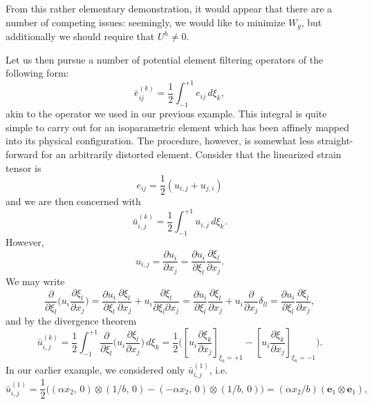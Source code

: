 \documentclass[11pt]{article} %
\begin{document}
From this rather elementary demonstration, it would appear that there are a number of competing issues: seemingly, we would like to minimize $W_g$, but additionally we should require that $U^h \neq 0$.

Let us then pursue a number of potential element filtering operators of the following form:
\begin{equation}
	\bar{e}_{ij}^{(k)} = \frac{1}{2} \int_{-1}^{+1} e_{ij} \, d \xi_k ,
\end{equation}
akin to the operator we used in our previous example. This integral is quite simple to carry out for an isoparametric element which has been affinely mapped into its physical configuration. The procedure, however, is somewhat less straight-forward for an arbitrarily distorted element. Consider that the linearized strain tensor is
\begin{equation}
	e_{ij} = \frac{1}{2} (u_{i,j} + u_{j,i})
\end{equation}
and we are then concerned with
\begin{equation}
	\bar{u}_{i,j}^{(k)} = \frac{1}{2} \int_{-1}^{+1} u_{i,j} \, d \xi_k .
\end{equation}
However,
\begin{equation}
	u_{i,j} = \frac{\partial u_i}{\partial x_j} = \frac{\partial u_i}{\partial \xi_l} \frac{\partial \xi_l}{\partial x_j}.
\end{equation}
We may write
\begin{equation}
	\frac{\partial}{\partial \xi_l} \bigg( u_i \frac{\partial \xi_l}{\partial x_j} \bigg) = \frac{\partial u_i}{\partial \xi_l} \frac{\partial \xi_l}{\partial x_j} + u_i \frac{\partial \xi_l}{\partial \xi_l \partial x_j} = \frac{\partial u_i}{\partial \xi_l} \frac{\partial \xi_l}{\partial x_j} + u_i \frac{\partial}{\partial x_j} \delta_{ll} = \frac{\partial u_i}{\partial \xi_l} \frac{\partial \xi_l}{\partial x_j},
\end{equation}
and by the divergence theorem
\begin{equation}
	\bar{u}_{i,j}^{(k)} = \frac{1}{2} \int_{-1}^{+1} \frac{\partial}{\partial \xi_l} \bigg( u_i \frac{\partial \xi_l}{\partial x_j} \bigg) \, d \xi_k = \frac{1}{2} \bigg( \left[ u_i \frac{\partial \xi_k}{\partial x_j} \right]_{\xi_k = +1} - \left[ u_i \frac{\partial \xi_k}{\partial x_j} \right]_{\xi_k = -1} \bigg).
\end{equation}
In our earlier example, we considered only $\bar{u}^{(1)}_{i,j}$, i.e.
\begin{equation}
	\bar{u}_{i,j}^{(1)} =\frac{1}{2} \bigg( (\alpha x_2, \, 0) \otimes (1/b, \, 0) - (-\alpha x_2, \, 0) \otimes (1/b, \, 0) \bigg) = (\alpha x_2 / b) (\mathbf{e}_1 \otimes \mathbf{e}_1),
\end{equation}
\end{document}

